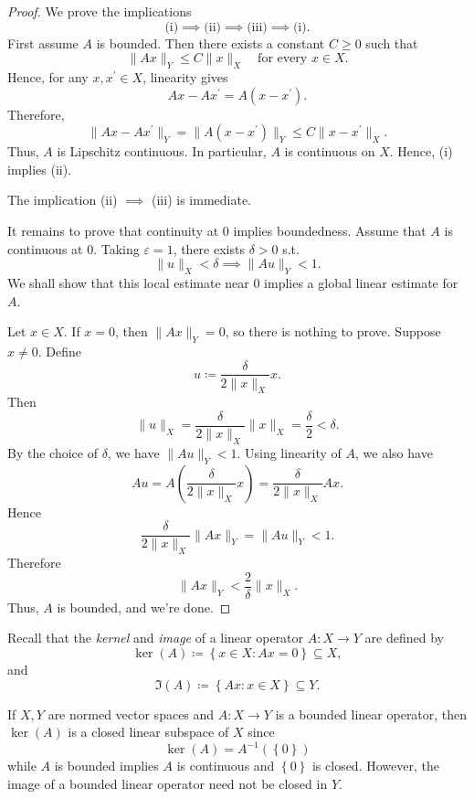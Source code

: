 \begin{proof}
    We prove the implications 
    \[
        \text{(i)} \implies \text{(ii)} \implies \text{(iii)}  \implies  \text{(i)}. 
    \]
    First assume \(A\) is bounded. Then there exists a constant \(C \ge 0\) such that 
    \[
        \lVert Ax \rVert_Y \le C \lVert x \rVert_X \quad \text{for every } x \in X.   
    \]  
    Hence, for any \(x, x^{\prime} \in X\), linearity gives 
    \[
        Ax - Ax^{\prime} = A(x - x^{\prime}).
    \] 
    Therefore,
    \[
        \lVert Ax - Ax^{\prime} \rVert_Y = \lVert A (x - x^{\prime} ) \rVert_Y \le C \lVert x - x^{\prime} \rVert_X.   
    \]
    Thus, \(A\) is Lipschitz continuous. In particular, \(A\) is continuous on \(X\). Hence, (i) implies (ii). 

    The implication (ii) \(\implies \) (iii) is immediate. 

    It remains to prove that continuity at \(0\) implies boundedness. Assume that \(A\) is continuous at \(0\). Taking \(\varepsilon = 1\), there exists \(\delta > 0\) s.t. 
    \[
        \lVert u \rVert_X < \delta \implies \lVert A u \rVert_Y < 1.  
    \]         
    We shall show that this local estimate near \(0\) implies a global linear estimate for \(A\). 

    Let \(x \in X\). If \(x = 0\), then \(\lVert Ax \rVert_Y = 0 \), so there is nothing to prove. Suppose \(x \neq 0\). Define 
    \[
        u \coloneqq \frac{\delta }{2 \lVert x \rVert_X } x.
    \]      
    Then 
    \[
        \lVert u \rVert_X = \frac{\delta}{2 \lVert x \rVert_X} \lVert x \rVert_X = \frac{\delta}{2} < \delta.  
    \]
    By the choice of \(\delta\), we have \(\lVert A u \rVert_Y < 1\). Using linearity of \(A\), we also have 
    \[
        Au = A \left( \frac{\delta}{2 \lVert x \rVert_X} x \right) = \frac{\delta}{2 \lVert x \rVert_X} Ax. 
    \]   
    Hence 
    \[
        \frac{\delta}{2 \lVert x \rVert_X} \lVert A x \rVert_Y = \lVert A u \rVert_Y < 1.  
    \]
    Therefore 
    \[
        \lVert Ax \rVert_Y < \frac{2}{\delta} \lVert x \rVert_X.  
    \]
    Thus, \(A\) is bounded, and we're done. 
\end{proof}

Recall that the \emph{kernel} and \emph{image} of a linear operator \(A: X \to Y\) are defined by 
\[
    \ker (A) \coloneqq \left\{ x \in X: Ax = 0 \right\} \subseteq X, 
\] 
and 
\[
    \Im (A) \coloneqq \left\{ Ax: x \in X \right\} \subseteq Y. 
\]

If \(X, Y\) are normed vector spaces and \(A: X \to Y\) is a bounded linear operator, then \(\ker (A)\) is a closed linear subspace of \(X\) since 
\[
    \ker (A) = A^{-1} (\left\{ 0 \right\} )
\]    
while \(A\) is bounded implies \(A\) is continuous and \(\left\{ 0 \right\} \) is closed. However, the image of a bounded linear operator need not be closed in \(Y\). 


